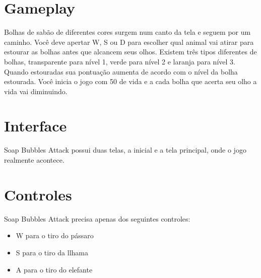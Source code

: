 \documentclass[a4paper,draft,12pt]{article}
\begin{document}
\section{Gameplay}

Bolhas de sabão de diferentes cores surgem num canto da tela e seguem por um caminho. Você deve apertar W, S ou D para escolher qual animal vai atirar para estourar as bolhas antes que alcancem seus olhos. Existem três tipos diferentes de bolhas, transparente para nível 1, verde para nível 2 e laranja para nível 3. Quando estouradas sua pontuação aumenta de acordo com o nível da bolha estourada. Você inicia o jogo com 50 de vida e a cada bolha que acerta seu olho a vida vai diminuindo.

\bigskip
\pagebreak
\section{Interface}
Soap Bubbles Attack possui duas telas, a inicial e a tela principal, onde o jogo realmente acontece.

\vspace{20cm}

\section{Controles}
Soap Bubbles Attack precisa apenas dos seguintes controles:
\begin{itemize}
\item W para o tiro do pássaro
\item S para o tiro da llhama
\item A para o tiro do elefante
\end{itemize}

\end{document}
